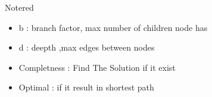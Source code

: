 \begin{prettyBox}{Note}{red}
\begin{itemize}
    \item b :  branch factor, max number of children node has 
    \item d : deepth ,max edges between nodes
    \item Completness : Find The Solution if it exist
    \item Optimal : if it result in shortest path
\end{itemize}
\end{prettyBox}
